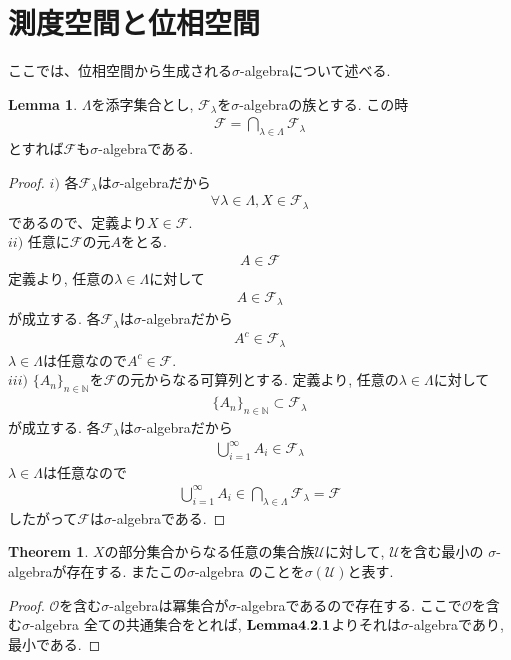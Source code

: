 \documentclass[11pt, a4paper, dvipdfmx]{jsbook}
\theoremstyle{definition}
\newtheorem{Theorem+}[Axiom+]{Theorem}
\newtheorem{Lemma+}[Axiom+]{Lemma}
\newcommand{\N}{\mathbb{N}}
\newcommand{\F}{\mathcal{F}}
\begin{document}
\section{測度空間と位相空間}
ここでは、位相空間から生成される$\sigma$-algebraについて述べる. 
\begin{Lemma+}
  $\Lambda$を添字集合とし, $\F_{\lambda}$を$\sigma$-algebraの族とする. この時
  \begin{align*}
    \F = \bigcap_{\lambda\in\Lambda}\F_{\lambda}
  \end{align*}
  とすれば$\F$も$\sigma$-algebraである.
  \begin{proof}
    $i)$ 各$\F_{\lambda}$は$\sigma$-algebraだから
    \begin{align*}
      \forall\lambda\in\Lambda, X\in\F_{\lambda}
    \end{align*}
    であるので、定義より$X\in\F$.\\
    $ii)$ 任意に$\F$の元$A$をとる.
    \begin{align*}
      A\in\F
    \end{align*}
    定義より, 任意の$\lambda\in\Lambda$に対して
    \begin{align*}
      A\in\F_{\lambda}
    \end{align*}
    が成立する. 各$\F_{\lambda}$は$\sigma$-algebraだから
    \begin{align*}
      A^{c}\in\F_{\lambda}
    \end{align*}
    $\lambda\in\Lambda$は任意なので$A^{c}\in\F$.\\
    $iii)$ $\{A_{n}\}_{n\in\N}$を$\F$の元からなる可算列とする. 定義より, 任意の$\lambda\in\Lambda$に対して
    \begin{align*}
      \{A_{n}\}_{n\in\N}\subset\F_{\lambda}
    \end{align*}
    が成立する.  各$\F_{\lambda}$は$\sigma$-algebraだから
    \begin{align*}
      \bigcup_{i = 1}^{\infty} A_{i}\in\F_{\lambda}
    \end{align*}
    $\lambda\in\Lambda$は任意なので
    \begin{align*}
      \bigcup_{i = 1}^{\infty} A_{i}\in\bigcap_{\lambda\in\Lambda}\F_{\lambda} = \F
    \end{align*}
    したがって$\F$は$\sigma$-algebraである.
  \end{proof}
\end{Lemma+}
\begin{Theorem+}
  $X$の部分集合からなる任意の集合族$\mathscr{U}$に対して, $\mathscr{U}$を含む最小の
  $\sigma$-algebraが存在する. またこの$\sigma$-algebra のことを$\sigma(\mathscr{U})$と表す.
  \begin{proof}
    $\mathscr{O}$を含む$\sigma$-algebraは冪集合が$\sigma$-algebraであるので存在する. ここで$\mathscr{O}$を含む$\sigma$-algebra 全ての共通集合をとれば, 
    ${\bf Lemma 4.2.1}$よりそれは$\sigma$-algebraであり, 最小である.
  \end{proof}
\end{Theorem+}
\end{document}
